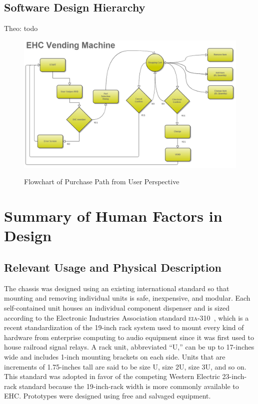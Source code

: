 \documentclass[12pt,draft,oneside]{article}
\begin{document}
\subsection{Software Design Hierarchy}
Theo: todo

\begin{figure}
  \includegraphics[width=6.5in]{2012-11-11_flowchart-of-purchase-path.png}
  \label{fig:purchase-path}
  \caption{Flowchart of Purchase Path from User Perspective}
\end{figure}


\section{Summary of Human Factors in Design}
\label{sec:hf}

\subsection{Relevant Usage and Physical Description}
The chassis was designed using an existing international standard so that mounting and removing individual units is safe, inexpensive, and modular. Each self-contained unit houses an individual component dispenser and is sized according to the Electronic Industries Association standard \textsc{eia-310}~\cite{eia-310}, which is a recent standardization of the 19-inch rack system used to mount every kind of hardware from enterprise computing to audio equipment since it was first used to house railroad signal relays. A rack unit, abbreviated ``U,'' can be up to 17-inches wide and includes 1-inch mounting brackets on each side. Units that are increments of 1.75-inches tall are said to be size U, size 2U, size 3U, and so on. This standard was adopted in favor of the competing Western Electric 23-inch-rack standard because the 19-inch-rack width is more commonly available to EHC. Prototypes were designed using free and salvaged equipment.
\end{document}
